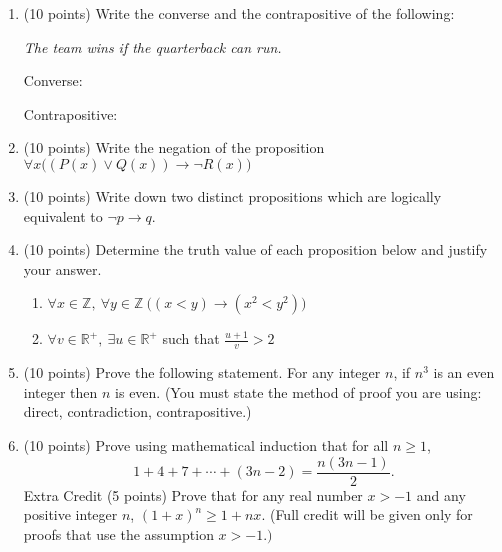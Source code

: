 \documentclass[12pt]{article}
\def\RR{{\mathbb R}}
\def\ZZ{{\mathbb Z}}
\begin{document}
\begin{enumerate}
\item  (10 points) Write the converse and the contrapositive of the following: \\
\begin{center}\emph{The team wins if the quarterback can run.}\end{center}

Converse:\\
\vspace{.2in}

Contrapositive:\\
\vspace{.2in}


\item (10 points) Write the negation of the proposition $\forall x \Big( (P(x) \vee Q(x)) \rightarrow \neg R(x)\Big)$
\vfill
\newpage

\item (10 points) Write down two distinct propositions which are logically equivalent to $\neg p \rightarrow q.$
\vspace{2in}

\item (10 points) Determine the truth value of each proposition below and justify your answer.
\begin{enumerate}
\item $\forall x \in \ZZ ,~\forall y \in \ZZ ~ \big( (x < y) \rightarrow (x^2 < y^2) \big)$
\vfill
\item $\forall v \in \RR^+,~ \exists u \in \RR^+$ such that $\frac{u+1}{v} > 2$
\vfill
\end{enumerate}
\newpage
\item (10 points) Prove the following statement. For any integer $n$, if $n^3$
is an even integer then $n$ is even. (You must state the method of proof you are using: direct, contradiction, contrapositive.)
\vfill
\newpage

\item (10 points) Prove using mathematical induction that for all $n \geq 1$,
$$1 + 4 + 7 + \cdots+ (3n- 2) = \frac{n(3n- 1)}{2}.$$
\newpage
\vfill
Extra Credit (5 points)
Prove that for any real number $x > -1$ and any positive integer $n$, $(1 + x)^n\geq 1 + nx.$ (Full credit will be given only for proofs that use the assumption $x > -1.)$
\vfill
\end{enumerate}
\end{document}
